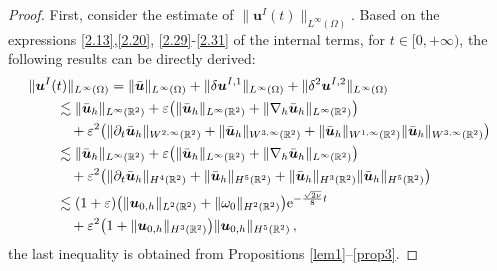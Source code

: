 \documentclass[pdflatex,sn-mathphys-num]{sn-jnl}%
\theoremstyle{thmstyleone}%
\theoremstyle{thmstyletwo}%
\theoremstyle{thmstylethree}%
\theoremstyle{thmstyletwo}
\begin{document}
\begin{proof}
	First, consider the estimate of $\lVert 
	\boldsymbol{u}^{I}(t) 
	\rVert_{L^{\infty}(\Omega)}$. Based on the expressions  \eqref{2.13},\eqref{2.20}, \eqref{2.29}-\eqref{2.31} of the internal terms, for $t\in [0,+\infty)$,  the following results can be directly derived:
	\begin{align*}
		&\lVert \boldsymbol{u}^{I}(t) \rVert_{L^\infty(\Omega)}
		=\lVert \bar{\boldsymbol{u}} \rVert_{L^\infty(\Omega)}
		+\lVert \delta\boldsymbol{u}^{I,1} \rVert_{L^\infty(\Omega)}
		+\lVert \delta^2\boldsymbol{u}^{I,2} \rVert_{L^\infty(\Omega)}
		\\\notag
		&\qquad\lesssim	 
		\lVert \bar{\boldsymbol{u}}_h \rVert_{L^\infty(\mathbb{R}^2)}
		+\varepsilon\big(
		\lVert \bar{\boldsymbol{u}}_h \rVert_{L^\infty(\mathbb{R}^2)}
		+\lVert \nabla_h\bar{\boldsymbol{u}}_h \rVert_{L^\infty(\mathbb{R}^2)}
		\big)
		\\\notag
		&\qquad\quad+\varepsilon^2\big(
		\lVert \partial_t\bar{\boldsymbol{u}}_h \rVert_{W^{2,\infty}(\mathbb{R}^2)}
		+\lVert \bar{\boldsymbol{u}}_h \rVert_{W^{3,\infty}(\mathbb{R}^2)}
		+\lVert \bar{\boldsymbol{u}}_h \rVert_{W^{1,\infty}(\mathbb{R}^2)}
		\lVert \bar{\boldsymbol{u}}_h \rVert_{W^{3,\infty}(\mathbb{R}^2)}\big)
		\\\notag
		&\qquad\lesssim 
		\lVert \bar{\boldsymbol{u}}_h \rVert_{L^\infty(\mathbb{R}^2)}
		+\varepsilon\big(
		\lVert \bar{\boldsymbol{u}}_h \rVert_{L^\infty(\mathbb{R}^2)}
		+\lVert \nabla_h\bar{\boldsymbol{u}}_h \rVert_{L^\infty(\mathbb{R}^2)}
		\big)
		\\\notag
		&\qquad\quad+\varepsilon^2\big(
		\lVert \partial_t\bar{\boldsymbol{u}}_h \rVert_{H^{4}(\mathbb{R}^2)}
		+\lVert \bar{\boldsymbol{u}}_h \rVert_{H^{5}(\mathbb{R}^2)}
		+\lVert \bar{\boldsymbol{u}}_h \rVert_{H^{3}(\mathbb{R}^2)}
		\lVert \bar{\boldsymbol{u}}_h \rVert_{H^{5}(\mathbb{R}^2)}\big)
		\\\notag
		&\qquad\lesssim
		(1+\varepsilon)\big(
		\lVert{\boldsymbol{u}}_{0,h}\rVert_{L^2(\mathbb{R}^2)}+\lVert{\omega}_0\rVert_{H^2(\mathbb{R}^2)}
		\big)\mathrm{e}^{-\frac{\sqrt{2\nu}}{8}  t}\\
		&\qquad\quad+\varepsilon^2
		\big(
		1+
		\lVert {\boldsymbol{u}}_{0,h} \rVert_{H^{3}(\mathbb{R}^2)}
		\big)
		\lVert {\boldsymbol{u}}_{0,h} \rVert_{H^{5}(\mathbb{R}^2)}
		\,,\notag
	\end{align*}
	the last inequality is obtained from Propositions \ref{lem1}--\ref{prop3}.
	

\end{proof}
\end{document}
